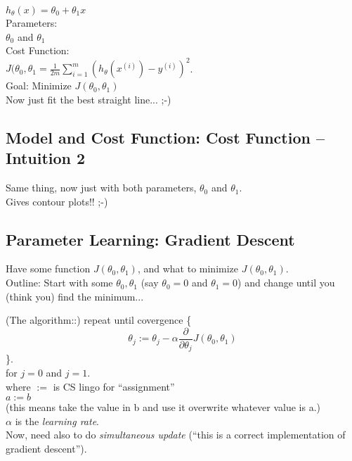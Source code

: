 \documentclass[11pt,a4paper]{article}
\begin{document}
$h_{\theta}(x) = \theta_{0} + \theta_{1} x$\\

\noindent
Parameters:\\

$\theta_{0}$ and $\theta_{1}$\\

\noindent
Cost Function:\\

$J(\theta_{0}, \theta_{1} = \frac{1}{2m} \sum_{i=1}^{m} (h_{\theta} (x^{(i)}) - y^{(i)})^{2}$.\\

\noindent
Goal: Minimize $J(\theta_{0}, \theta_{1})$\\

Now just fit the best straight line... ;-) \\



\subsection{Model and Cost Function: Cost Function -- Intuition 2}
Same thing, now just with both parameters, $\theta_{0}$ and $\theta_{1}$.\\
Gives contour plots!! ;-) \\


\subsection{Parameter Learning: Gradient Descent}
Have some function $J(\theta_{0}, \theta_{1})$, and what to minimize
$J(\theta_{0}
, \theta_{1})$. \\

Outline: Start with some $\theta_{0}, \theta_{1}$ 
(say $\theta_{0}=0$ and $\theta_{1}=0$) and change until 
you (think you) find the minimum...

(The algorithm::) 
repeat until covergence \{ \\
\begin{equation}
\theta_{j} := \theta_{j} - \alpha \frac{\partial}{\partial \theta_{j}} J(\theta_{0}, \theta_{1})
\end{equation}
\}. \\
for $j=0$ and $j=1$. \\

where $:=$ is CS lingo for ``assignment''\\
$a := b$\\
(this means take the value in b and use it overwrite whatever value is a.)\\
$\alpha$ is the {\it learning rate}.\\
Now, need also to do {\it simultaneous update} (``this is a correct
implementation of gradient descent'').
\end{document}
